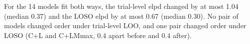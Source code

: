 For the 14 models fit both ways, the trial-level elpd changed by at most 1.04 (median 0.37) and the LOSO elpd by at most 0.67 (median 0.30). No pair of models changed order under trial-level LOO, and one pair changed order under LOSO (C+L and C+LMmax, 0.4 apart before and 0.4 after).
